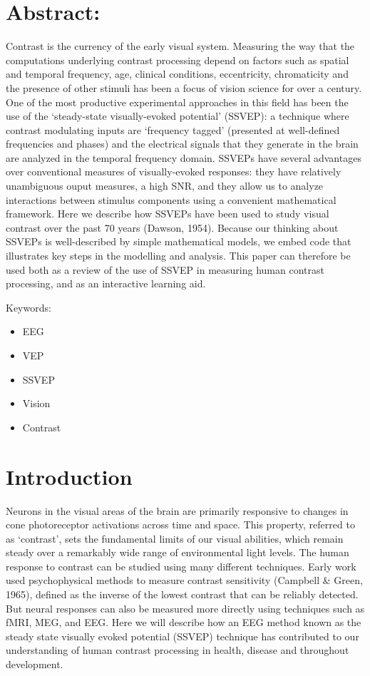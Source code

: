\documentclass[
  letterpaper,
  DIV=11,
  numbers=noendperiod]{scrartcl}
\providecommand{\tightlist}{%
  \setlength{\itemsep}{0pt}\setlength{\parskip}{0pt}}\usepackage{longtable,booktabs,array}
\begin{document}
\section{Abstract:}\label{abstract}

Contrast is the currency of the early visual system. Measuring the way
that the computations underlying contrast processing depend on factors
such as spatial and temporal frequency, age, clinical conditions,
eccentricity, chromaticity and the presence of other stimuli has been a
focus of vision science for over a century. One of the most productive
experimental approaches in this field has been the use of the
`steady-state visually-evoked potential' (SSVEP): a technique where
contrast modulating inputs are `frequency tagged' (presented at
well-defined frequencies and phases) and the electrical signals that
they generate in the brain are analyzed in the temporal frequency
domain. SSVEPs have several advantages over conventional measures of
visually-evoked responses: they have relatively unambiguous ouput
measures, a high SNR, and they allow us to analyze interactions between
stimulus components using a convenient mathematical framework. Here we
describe how SSVEPs have been used to study visual contrast over the
past 70 years (Dawson, 1954). Because our thinking about SSVEPs is
well-described by simple mathematical models, we embed code that
illustrates key steps in the modelling and analysis. This paper can
therefore be used both as a review of the use of SSVEP in measuring
human contrast processing, and as an interactive learning aid.

Keywords:

\begin{itemize}
\tightlist
\item
  EEG
\item
  VEP
\item
  SSVEP
\item
  Vision
\item
  Contrast
\end{itemize}

\newpage{}

\section{Introduction}\label{introduction}

Neurons in the visual areas of the brain are primarily responsive to
changes in cone photoreceptor activations across time and space. This
property, referred to as `contrast', sets the fundamental limits of our
visual abilities, which remain steady over a remarkably wide range of
environmental light levels. The human response to contrast can be
studied using many different techniques. Early work used psychophysical
methods to measure contrast sensitivity (Campbell \& Green, 1965),
defined as the inverse of the lowest contrast that can be reliably
detected. But neural responses can also be measured more directly using
techniques such as fMRI, MEG, and EEG. Here we will describe how an EEG
method known as the steady state visually evoked potential (SSVEP)
technique has contributed to our understanding of human contrast
processing in health, disease and throughout development.
\end{document}
